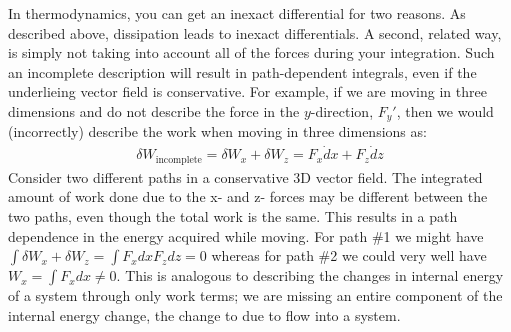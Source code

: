 \documentclass[12pt]{article}
\begin{document}
 In thermodynamics, you can get an inexact differential for two reasons. As described above, dissipation leads to inexact differentials. A second, related way, is simply not taking into account all of the forces during your integration. Such an incomplete description will result in path-dependent integrals, even if the underlieing vector field is conservative. For example, if we are moving in three dimensions and do not describe the force in the $y$-direction, $F_y'$, then we would (incorrectly) describe the work when moving in three dimensions as:
\begin{align*}
\delta W_\text{incomplete} = \delta W_x + \delta W_z = F_x \dot dx + F_z \dot dz 
\end{align*}
Consider two different paths in a conservative 3D vector field.  The integrated amount of work done due to the x- and z- forces may be different between the two paths, even though the total work is the same. This results in a path dependence in the energy acquired while moving.  For path \#1 we might have $\int \delta W_x + \delta W_z = \int F_x dx F_z dz = 0$ whereas for path \#2 we could very well have $W_x = \int F_x dx \neq 0$.  This is analogous to describing the changes in internal energy of a system through only work terms; we are missing an entire component of the internal energy change, the change to due to  flow into a system.
\end{document}
